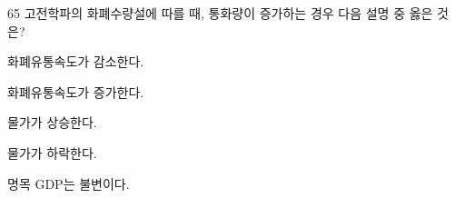 \begin{question}{65}
고전학파의 화폐수량설에 따를 때, 통화량이 증가하는 경우 다음 설명 중 옳은 것은?
\begin{choices}
  \item 화폐유통속도가 감소한다.
  \item 화폐유통속도가 증가한다.
  \item 물가가 상승한다.
  \item 물가가 하락한다.
  \item 명목 GDP는 불변이다.
\end{choices}
\end{question}
